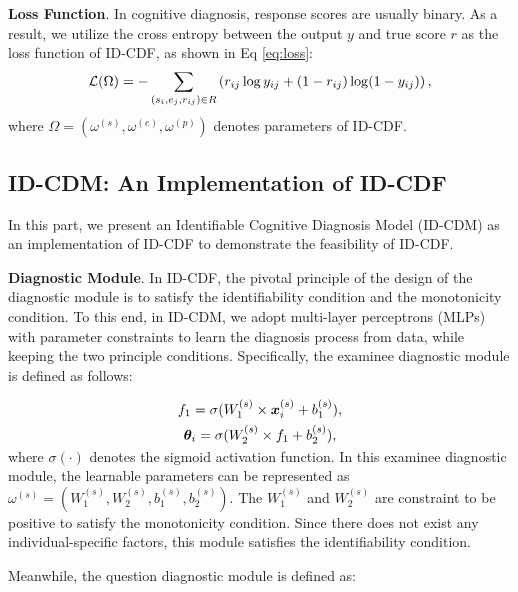 \documentclass[sigconf]{acmart}
\begin{document}
 
\par \textbf{Loss Function}. In cognitive diagnosis, response scores are usually binary. As a result, we utilize the cross entropy between the output $y$ and true score $r$ as the loss function of ID-CDF, as shown in Eq \eqref{eq:loss}:
\vspace{-5pt}
\begin{equation}\label{eq:loss}
  \mathcal{L}(\Omega) = -\sum_{(s_i,e_j,r_{ij})\in R}\left(r_{ij}\log y_{ij} + (1-r_{ij})\log(1-y_{ij})\right),
  \vspace{-5pt}
\end{equation}
where $\Omega = \left(\omega^{(s)},\omega^{(e)},\omega^{(p)}\right)$ denotes parameters of ID-CDF.


 
\subsection{ID-CDM: An Implementation of ID-CDF}\label{sec:id-cdm}
\par In this part, we present an Identifiable Cognitive Diagnosis Model (ID-CDM) as an implementation of ID-CDF to demonstrate the feasibility of ID-CDF.
\par \textbf{Diagnostic Module}. In ID-CDF, the pivotal principle of the design of the diagnostic module is to satisfy the identifiability condition and the monotonicity condition. To this end, in ID-CDM, we adopt multi-layer perceptrons (MLPs) with parameter constraints to learn the diagnosis process from data, while keeping the two principle conditions. Specifically, the examinee diagnostic module is defined as follows:

\vspace{-2pt}
\begin{gather}
  f_1 = \sigma (W^{(s)}_1\times \bm{x}^{(s)}_i + b^{(s)}_1),\\
  \bm{\theta}_i = \sigma (W^{(s)}_2\times f_1 + b^{(s)}_2),
  \vspace{-5pt}
\end{gather}
where $\sigma(\cdot)$ denotes the sigmoid activation function. In this examinee diagnostic module, the learnable parameters can be represented as $\omega^{(s)} = \left(W^{(s)}_1,W^{(s)}_2,b^{(s)}_1,b^{(s)}_2\right)$. The $W^{(s)}_1$ and $W^{(s)}_2$ are constraint to be positive to satisfy the monotonicity condition. Since there does not exist any individual-specific factors, this module satisfies the identifiability condition.
\par Meanwhile, the question diagnostic module is defined as:
\end{document}
